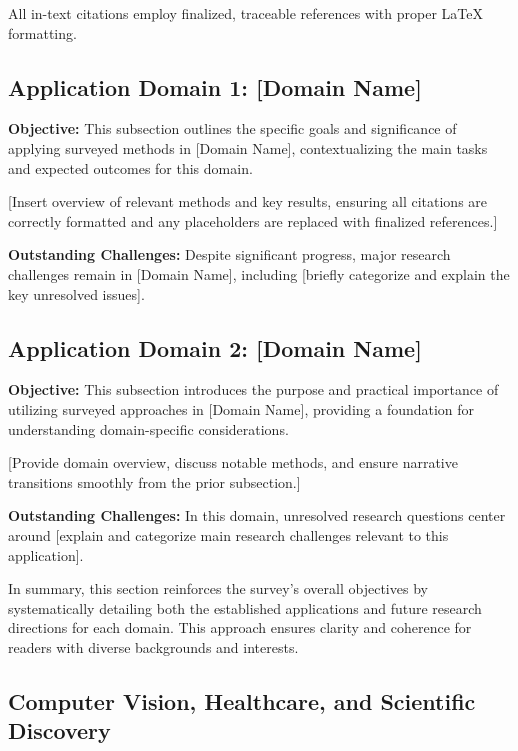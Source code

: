 \documentclass[sigconf]{acmart}
\begin{document}
All in-text citations employ finalized, traceable references with proper LaTeX formatting.


\subsection{Application Domain 1: [Domain Name]}
\textbf{Objective:} This subsection outlines the specific goals and significance of applying surveyed methods in [Domain Name], contextualizing the main tasks and expected outcomes for this domain.

[Insert overview of relevant methods and key results, ensuring all citations are correctly formatted and any placeholders are replaced with finalized references.]

\textbf{Outstanding Challenges:} Despite significant progress, major research challenges remain in [Domain Name], including [briefly categorize and explain the key unresolved issues].

\subsection{Application Domain 2: [Domain Name]}
\textbf{Objective:} This subsection introduces the purpose and practical importance of utilizing surveyed approaches in [Domain Name], providing a foundation for understanding domain-specific considerations.

[Provide domain overview, discuss notable methods, and ensure narrative transitions smoothly from the prior subsection.]

\textbf{Outstanding Challenges:} In this domain, unresolved research questions center around [explain and categorize main research challenges relevant to this application].


In summary, this section reinforces the survey’s overall objectives by systematically detailing both the established applications and future research directions for each domain. This approach ensures clarity and coherence for readers with diverse backgrounds and interests.

\subsection{Computer Vision, Healthcare, and Scientific Discovery}
\end{document}
